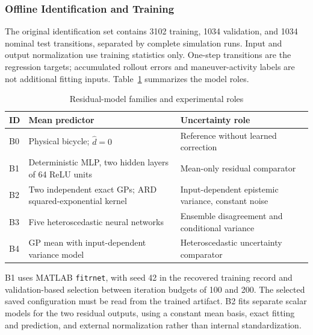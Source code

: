 \documentclass[10pt,journal]{IEEEtran}
\begin{document}
\subsubsection{Offline Identification and Training}
The original identification set contains 3102 training, 1034 validation, and 1034 nominal test transitions, separated by complete simulation runs. Input and output normalization use training statistics only. One-step transitions are the regression targets; accumulated rollout errors and maneuver-activity labels are not additional fitting inputs. Table~\ref{tab:models} summarizes the model roles.
\begin{table}[!t]
\caption{Residual-model families and experimental roles}
\label{tab:models}\centering\footnotesize
\begin{tabularx}{\columnwidth}{@{}lXX@{}}\toprule
ID & Mean predictor & Uncertainty role\\\midrule
B0 & Physical bicycle; $\hat d=0$ & Reference without learned correction\\
B1 & Deterministic MLP, two hidden layers of 64 ReLU units & Mean-only residual comparator\\
B2 & Two independent exact GPs; ARD squared-exponential kernel & Input-dependent epistemic variance, constant noise\\
B3 & Five heteroscedastic neural networks & Ensemble disagreement and conditional variance\\
B4 & GP mean with input-dependent variance model & Heteroscedastic uncertainty comparator\\\bottomrule
\end{tabularx}
\end{table}

B1 uses MATLAB \texttt{fitrnet}, with seed 42 in the recovered training record and validation-based selection between iteration budgets of 100 and 200. The selected saved configuration must be read from the trained artifact. B2 fits separate scalar models for the two residual outputs, using a constant mean basis, exact fitting and prediction, and external normalization rather than internal standardization.
\end{document}
